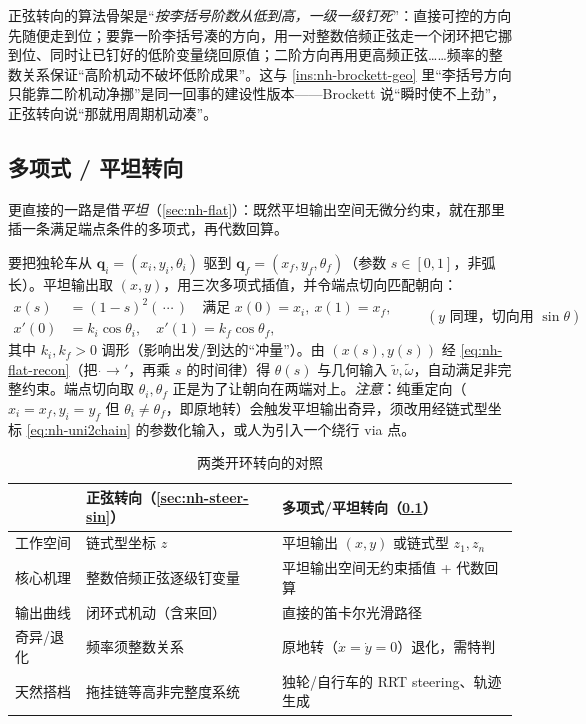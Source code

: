 \begin{insight}\label{ins:nh-sin-rhythm}
正弦转向的算法骨架是“\emph{按李括号阶数从低到高，一级一级钉死}”：直接可控的方向先随便走到位；要靠一阶李括号凑的方向，用一对整数倍频正弦走一个闭环把它挪到位、同时让已钉好的低阶变量绕回原值；二阶方向再用更高频正弦……频率的整数关系保证“高阶机动不破坏低阶成果”。这与 \cref{ins:nh-brockett-geo} 里“李括号方向只能靠二阶机动净挪”是同一回事的建设性版本——Brockett 说“瞬时使不上劲”，正弦转向说“那就用周期机动凑”。
\end{insight}

\subsection{多项式 / 平坦转向}
\label{sec:nh-steer-poly}

更直接的一路是借\emph{平坦}（\cref{sec:nh-flat}）：既然平坦输出空间无微分约束，就在那里插一条满足端点条件的多项式，再代数回算。

\begin{example}[独轮车的笛卡尔三次多项式转向]\label{ex:nh-poly-steer}
要把独轮车从 $\mathbf{q}_i=(x_i,y_i,\theta_i)$ 驱到 $\mathbf{q}_f=(x_f,y_f,\theta_f)$（参数 $s\in[0,1]$，非弧长）。平坦输出取 $(x,y)$，用三次多项式插值，并令端点切向匹配朝向：
\begin{equation}
  \begin{aligned}
    x(s)&=(1-s)^2(\,\cdots\,)\quad\text{满足 } x(0)=x_i,\ x(1)=x_f,\\
    x'(0)&=k_i\cos\theta_i,\quad x'(1)=k_f\cos\theta_f,
  \end{aligned}
  \qquad (y\text{ 同理，切向用 }\sin\theta)
  \label{eq:nh-poly}
\end{equation}
其中 $k_i,k_f>0$ 调形（影响出发/到达的“冲量”）。由 $(x(s),y(s))$ 经 \cref{eq:nh-flat-recon}（把 $\dot{}\to{}'$，再乘 $s$ 的时间律）得 $\theta(s)$ 与几何输入 $\tilde v,\tilde\omega$，自动满足非完整约束。端点切向取 $\theta_i,\theta_f$ 正是为了让朝向在两端对上。\emph{注意}：纯重定向（$x_i{=}x_f,y_i{=}y_f$ 但 $\theta_i\neq\theta_f$，即原地转）会触发平坦输出奇异，须改用经链式型坐标 \cref{eq:nh-uni2chain} 的参数化输入，或人为引入一个绕行 via 点。
\end{example}

\begin{table}[H]\centering\small
\caption{两类开环转向的对照}
\label{tab:nh-steer}
\begin{tabular}{lll}
\toprule
 & 正弦转向（\cref{sec:nh-steer-sin}） & 多项式/平坦转向（\cref{sec:nh-steer-poly}） \\
\midrule
工作空间 & 链式型坐标 $z$ & 平坦输出 $(x,y)$ 或链式型 $z_1,z_n$ \\
核心机理 & 整数倍频正弦逐级钉变量 & 平坦输出空间无约束插值 + 代数回算 \\
输出曲线 & 闭环式机动（含来回） & 直接的笛卡尔光滑路径 \\
奇异/退化 & 频率须整数关系 & 原地转（$\dot x{=}\dot y{=}0$）退化，需特判 \\
天然搭档 & 拖挂链等高非完整度系统 & 独轮/自行车的 RRT steering、轨迹生成 \\
\bottomrule
\end{tabular}
\end{table}

